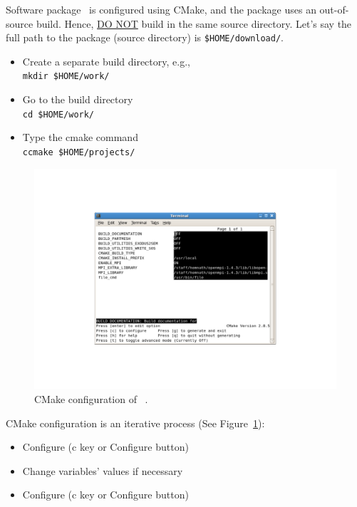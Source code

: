 Software package \pack\ is configured using CMake, and the package uses an out-of-source build. Hence, \underline{DO NOT} build in the same source directory. Let's say the full path to the package (source directory) is \texttt{\$HOME/download/\pack}.

\begin{itemize}
\item Create a separate build directory, e.g.,\\
\texttt{mkdir \$HOME/work/\pack}

\item Go to the build directory \\
\texttt{cd \$HOME/work/\pack}

\item Type the cmake command \\
\texttt{ccmake \$HOME/projects/\pack}
\end{itemize}

\begin{figure}[ht]
\centering
\includegraphics[scale=1.0]{cmake}
\caption{CMake configuration of \pack\ .}
\label{fig:cmake}
\end{figure}

CMake configuration is an iterative process (See Figure~\ref{fig:cmake}):
\begin{itemize}
\item Configure (c key or Configure button)
\item Change variables' values if necessary
\item Configure (c key or Configure button)
\end{itemize}


